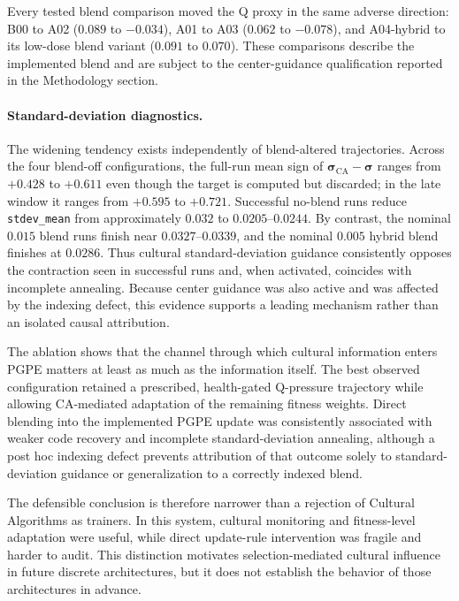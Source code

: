 Every tested blend comparison moved the Q proxy in the same adverse direction: B00 to A02 ($0.089$ to $-0.034$), A01 to A03 ($0.062$ to $-0.078$), and A04-hybrid to its low-dose blend variant ($0.091$ to $0.070$). These comparisons describe the implemented blend and are subject to the center-guidance qualification reported in the Methodology section.

\paragraph{Standard-deviation diagnostics.}
The widening tendency exists independently of blend-altered trajectories. Across the four blend-off configurations, the full-run mean sign of $\boldsymbol{\sigma}_{\mathrm{CA}}-\boldsymbol{\sigma}$ ranges from $+0.428$ to $+0.611$ even though the target is computed but discarded; in the late window it ranges from $+0.595$ to $+0.721$. Successful no-blend runs reduce \texttt{stdev\_mean} from approximately $0.032$ to $0.0205$--$0.0244$. By contrast, the nominal $0.015$ blend runs finish near $0.0327$--$0.0339$, and the nominal $0.005$ hybrid blend finishes at $0.0286$. Thus cultural standard-deviation guidance consistently opposes the contraction seen in successful runs and, when activated, coincides with incomplete annealing. Because center guidance was also active and was affected by the indexing defect, this evidence supports a leading mechanism rather than an isolated causal attribution.

The ablation shows that the channel through which cultural information enters PGPE matters at least as much as the information itself. The best observed configuration retained a prescribed, health-gated Q-pressure trajectory while allowing CA-mediated adaptation of the remaining fitness weights. Direct blending into the implemented PGPE update was consistently associated with weaker code recovery and incomplete standard-deviation annealing, although a post hoc indexing defect prevents attribution of that outcome solely to standard-deviation guidance or generalization to a correctly indexed blend.

The defensible conclusion is therefore narrower than a rejection of Cultural Algorithms as trainers. In this system, cultural monitoring and fitness-level adaptation were useful, while direct update-rule intervention was fragile and harder to audit. This distinction motivates selection-mediated cultural influence in future discrete architectures, but it does not establish the behavior of those architectures in advance.

